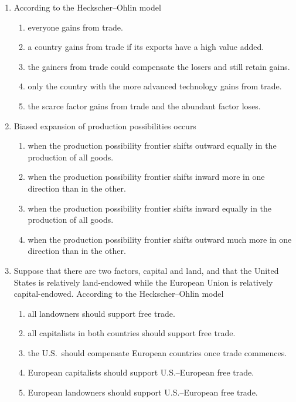 \documentclass[12pt]{article}
\begin{document}
\begin{enumerate}[label=\textbf{\arabic*.}]
\newpage
\item According to the Heckscher--Ohlin model
\begin{enumerate}[label=\Alph*.]
\item everyone gains from trade.
\item a country gains from trade if its exports have a high value added.
\item the gainers from trade could compensate the losers and still retain gains.
\item only the country with the more advanced technology gains from trade.
\item the scarce factor gains from trade and the abundant factor loses.
\end{enumerate}
\vspace{0.75 cm}
\item Biased expansion of production possibilities occurs
\begin{enumerate}[label=\Alph*.]
\item when the production possibility frontier shifts outward equally in the production of all goods.
\item when the production possibility frontier shifts inward more in one direction than in the other.
\item when the production possibility frontier shifts inward equally in the production of all goods.
\item when the production possibility frontier shifts outward much more in one direction than in the other.
\end{enumerate}
\vspace{0.75 cm}
\item Suppose that there are two factors, capital and land, and that the United States is relatively land-endowed while the European Union is relatively capital-endowed. According to the Heckscher--Ohlin model
\begin{enumerate}[label=\Alph*.]
\item all landowners should support free trade.
\item all capitalists in both countries should support free trade.
\item the U.S.\ should compensate European countries once trade commences.
\item European capitalists should support U.S.--European free trade.
\item European landowners should support U.S.--European free trade.
\end{enumerate}
\newpage


\end{enumerate}
\end{document}
